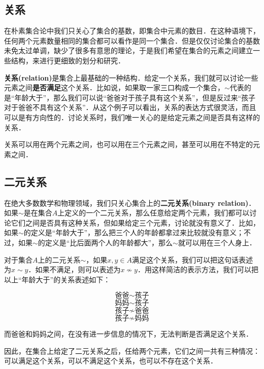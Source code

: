 \subsection{关系}

在朴素集合论中我们只关心了集合的基数，即集合中元素的数目．在这种语境下，任何两个元素数量相同的集合都可以看作是同一个集合．但是仅仅讨论集合的基数未免太过单调，缺少了很多有意思的理论，于是我们希望在集合的元素之间建立一些结构，来进行更细致的划分和研究．

\textbf{关系(relation)}是集合上最基础的一种结构．给定一个关系，我们就可以讨论一些元素之间\textbf{是否满足}这个关系．比如说，如果取一家三口构成一个集合，$\sim$代表的是“年龄大于”，那么我们可以说“爸爸对于孩子具有这个关系”，但是反过来“孩子对于爸爸不具有这个关系”．从这个例子可以看出，关系的表达方式很灵活，而且可以是有方向性的．讨论关系时，我们唯一关心的是给定元素之间是否具有这样的关系．

关系可以用在两个元素之间，也可以用在三个元素之间，甚至可以用在不特定的元素之间．

\subsection{二元关系}

在绝大多数数学和物理领域，我们只关心集合上的\textbf{二元关系(binary relation)}．如果$\sim$是在集合$A$上定义的一个二元关系，那么任意给定两个元素，我们都可以讨论它们之间是否具有这种关系，但如果给定三个元素，讨论就没有意义了．比如，如果$\sim$的定义是“年龄大于”，那么把三个人的年龄都拿过来比较就没有意义；不过，如果$\sim$的定义是“比后面两个人的年龄都大”，那么$\sim$就可以用在三个人身上．

对于集合$A$上的二元关系$\sim$，如果$x, y\in A$满足这个关系，我们可以把这句话表述为$x\sim y$．如果不满足，则可以表述为$x\not\sim y$．用这样简洁的表示方法，我们可以把以上“年龄大于”的关系表述如下：

$$\text{爸爸}\sim\text{孩子}$$ $$\text{妈妈}\sim\text{孩子}$$ $$\text{孩子}\not\sim\text{爸爸}$$ $$\text{孩子}\not\sim\text{妈妈}$$

而爸爸和妈妈之间，在没有进一步信息的情况下，无法判断是否满足这个关系．

因此，在集合上给定了二元关系之后，任给两个元素，它们之间一共有三种情况：可以满足这个关系，可以不满足这个关系，也可以不存在这个关系．



